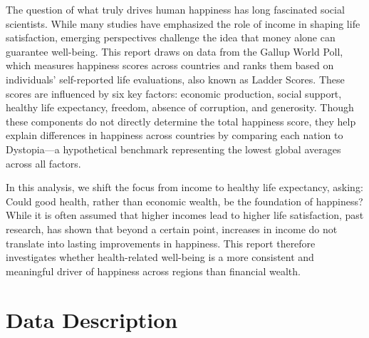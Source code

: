 \documentclass[11pt,preprint]{elsarticle}
\numberwithin{equation}{section}
\numberwithin{figure}{section}
\numberwithin{table}{section}
\begin{document}
The question of what truly drives human happiness has long fascinated
social scientists. While many studies have emphasized the role of income
in shaping life satisfaction, emerging perspectives challenge the idea
that money alone can guarantee well-being. This report draws on data
from the Gallup World Poll, which measures happiness scores across
countries and ranks them based on individuals' self-reported life
evaluations, also known as Ladder Scores. These scores are influenced by
six key factors: economic production, social support, healthy life
expectancy, freedom, absence of corruption, and generosity. Though these
components do not directly determine the total happiness score, they
help explain differences in happiness across countries by comparing each
nation to Dystopia---a hypothetical benchmark representing the lowest
global averages across all factors.

In this analysis, we shift the focus from income to healthy life
expectancy, asking: Could good health, rather than economic wealth, be
the foundation of happiness? While it is often assumed that higher
incomes lead to higher life satisfaction, past research, has shown that
beyond a certain point, increases in income do not translate into
lasting improvements in happiness. This report therefore investigates
whether health-related well-being is a more consistent and meaningful
driver of happiness across regions than financial wealth.

\section{Data Description}\label{data-description}
\end{document}
